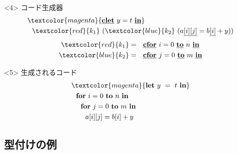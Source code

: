 \documentclass[dvipdfmx,cjk,xcolor=dvipsnames,envcountsect,notheorems,12pt]{beamer}
\newcommand\cLet{\underline{\textbf{clet}}}
\newcommand\cIn{\underline{\textbf{in}}}
\newcommand\red[1]{\textcolor{red}{#1}}
\newcommand\magenta[1]{\textcolor{magenta}{#1}}
\newcommand\blue[1]{\textcolor{blue}{#1}}
\newcommand\forin[2]{\textbf{for}~{#1}~\textbf{to}~{#2}~\textbf{in}}
\newcommand\cforin[2]{\underline{\textbf{cfor}}~{#1}~\underline{\textbf{to}}~{#2}~\underline{\textbf{in}}}
\newcommand\Let{\textbf{let}}
\newcommand\In{\textbf{in}}
\newcommand\cArray[1]{\underline{[{#1}]}}
\newcommand\cArrays[2]{\underline{[{#1}][{#2}]}}
\theoremstyle{definition}
\begin{document}
\begin{frame}
  \begin{onlyenv}<4>
    コード生成器
    \begin{align*}
      & \magenta{\cLet~y=t~\cIn} \\
      & ~~\red{k_1}~(\blue{k_2}~(a\cArrays{i}{j} = b\cArray{i} + y))
    \end{align*}
    \begin{align*}
      \red{k_1} &= ~~\cforin{i = 0}{n} \\
      \blue{k_2} &= ~~\cforin{j = 0}{m} \\
    \end{align*}
  \end{onlyenv}

  \begin{onlyenv}<5>
    生成されるコード
    \begin{align*}
          & \magenta{\Let ~y ~= ~t ~\In} \\
          & ~~\forin{i = 0}{n} \\
          & ~~~~\forin{j = 0}{m} \\
          & ~~~~~~a[i][j] = b[i] + y \\
    \end{align*}
  \end{onlyenv}
\end{frame}

\subsection{型付けの例}
\end{document}
